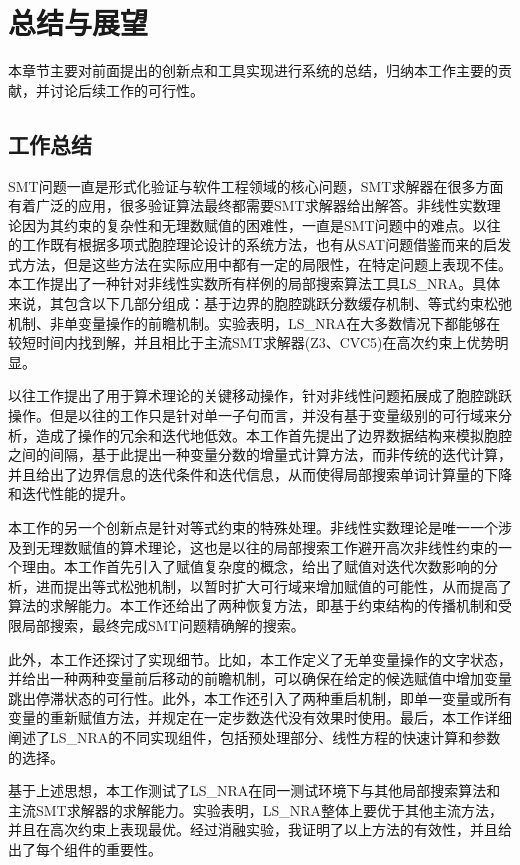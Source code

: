 \chapter{总结与展望}\label{chap:conclusion}

本章节主要对前面提出的创新点和工具实现进行系统的总结，归纳本工作主要的贡献，并讨论后续工作的可行性。

\section{工作总结}
SMT问题一直是形式化验证与软件工程领域的核心问题，SMT求解器在很多方面有着广泛的应用，很多验证算法最终都需要SMT求解器给出解答。非线性实数理论因为其约束的复杂性和无理数赋值的困难性，一直是SMT问题中的难点。以往的工作既有根据多项式胞腔理论设计的系统方法，也有从SAT问题借鉴而来的启发式方法，但是这些方法在实际应用中都有一定的局限性，在特定问题上表现不佳。本工作提出了一种针对非线性实数所有样例的局部搜索算法工具LS\_NRA。具体来说，其包含以下几部分组成：基于边界的胞腔跳跃分数缓存机制、等式约束松弛机制、非单变量操作的前瞻机制。实验表明，LS\_NRA在大多数情况下都能够在较短时间内找到解，并且相比于主流SMT求解器(Z3、CVC5)在高次约束上优势明显。

以往工作提出了用于算术理论的关键移动操作，针对非线性问题拓展成了胞腔跳跃操作。但是以往的工作只是针对单一子句而言，并没有基于变量级别的可行域来分析，造成了操作的冗余和迭代地低效。本工作首先提出了边界数据结构来模拟胞腔之间的间隔，基于此提出一种变量分数的增量式计算方法，而非传统的迭代计算，并且给出了边界信息的迭代条件和迭代信息，从而使得局部搜索单词计算量的下降和迭代性能的提升。

本工作的另一个创新点是针对等式约束的特殊处理。非线性实数理论是唯一一个涉及到无理数赋值的算术理论，这也是以往的局部搜索工作避开高次非线性约束的一个理由。本工作首先引入了赋值复杂度的概念，给出了赋值对迭代次数影响的分析，进而提出等式松弛机制，以暂时扩大可行域来增加赋值的可能性，从而提高了算法的求解能力。本工作还给出了两种恢复方法，即基于约束结构的传播机制和受限局部搜索，最终完成SMT问题精确解的搜索。

此外，本工作还探讨了实现细节。比如，本工作定义了无单变量操作的文字状态，并给出一种两种变量前后移动的前瞻机制，可以确保在给定的候选赋值中增加变量跳出停滞状态的可行性。此外，本工作还引入了两种重启机制，即单一变量或所有变量的重新赋值方法，并规定在一定步数迭代没有效果时使用。最后，本工作详细阐述了LS\_NRA的不同实现组件，包括预处理部分、线性方程的快速计算和参数的选择。

基于上述思想，本工作测试了LS\_NRA在同一测试环境下与其他局部搜索算法和主流SMT求解器的求解能力。实验表明，LS\_NRA整体上要优于其他主流方法，并且在高次约束上表现最优。经过消融实验，我证明了以上方法的有效性，并且给出了每个组件的重要性。

